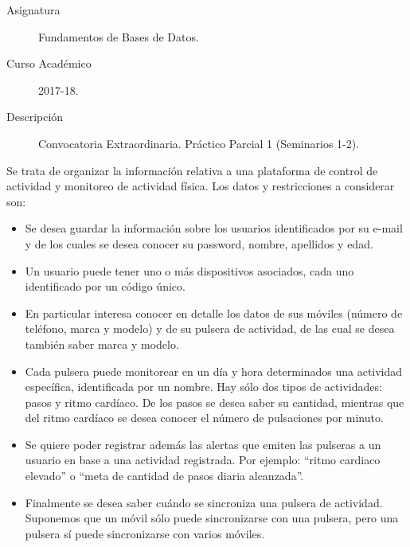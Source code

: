 \documentclass[12pt]{article}
\begin{document}

    
    

    \begin{description}
        \item[Asignatura] Fundamentos de Bases de Datos.
        \item[Curso Académico] 2017-18.
        \item[Descripción] Convocatoria Extraordinaria. Práctico Parcial 1 (Seminarios 1-2).
    
    \end{description}
    \newpage



    Se trata de organizar la información relativa a una plataforma de control de actividad y monitoreo de actividad física. Los datos y restricciones a considerar son:
    \begin{itemize}
        \item Se desea guardar la información sobre los usuarios identificados por su e-mail y de los cuales se desea conocer su password, nombre, apellidos y edad.
        \item Un usuario puede tener uno o más dispositivos asociados, cada uno identificado por un código único.
        \item En particular interesa conocer en detalle los datos de sus móviles (número de teléfono, marca y modelo) y de su pulsera de actividad, de las cual se desea también saber marca y modelo.
        \item Cada pulsera puede monitorear en un día y hora determinados una actividad específica, identificada por un nombre. Hay sólo dos tipos de actividades: pasos y ritmo cardíaco. De los pasos se desea saber su cantidad, mientras que del ritmo cardíaco se desea conocer el número de pulsaciones por minuto.
        \item Se quiere poder registrar además las alertas que emiten las pulseras a un usuario en base a una actividad registrada. Por ejemplo: ``ritmo cardiaco elevado'' o ``meta de cantidad de pasos diaria alcanzada''.
        \item Finalmente se desea saber cuándo se sincroniza una pulsera de actividad. Suponemos que un móvil sólo puede sincronizarse con una pulsera, pero una pulsera sí puede sincronizarse con varios móviles.
    \end{itemize}
\end{document}
